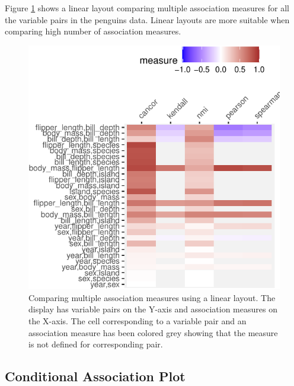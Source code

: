 Figure \ref{fig:compare-linear} shows a linear layout comparing multiple
association measures for all the variable pairs in the penguins data.
Linear layouts are more suitable when comparing high number of
association measures.

\begin{Schunk}
\begin{figure}

{\centering \includegraphics{rj_paper_files/figure-latex/compare-linear-1} 

}

\caption[Comparing multiple association measures using a linear layout]{Comparing multiple association measures using a linear layout. The display has variable pairs on the Y-axis and association measures on the X-axis. The cell corresponding to a variable pair and an association measure has been colored grey showing that the measure is not defined for corresponding pair.}\label{fig:compare-linear}
\end{figure}
\end{Schunk}

\hypertarget{conditional-association-plot}{%
\subsection{Conditional Association
Plot}\label{conditional-association-plot}}

